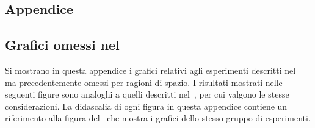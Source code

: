 
\begin{appendices}
\chapter*{Appendice}\label{appendix}
\section*{Grafici omessi nel~}
Si mostrano in questa appendice i grafici relativi agli esperimenti descritti nel~ ma precedentemente omessi per ragioni di spazio.
I risultati mostrati nelle seguenti figure sono analoghi a quelli descritti nel~, per cui valgono le stesse considerazioni.
La didascalia di ogni figura in questa appendice contiene un riferimento alla figura del~ che mostra i grafici dello stesso gruppo di esperimenti.


\end{appendices}
